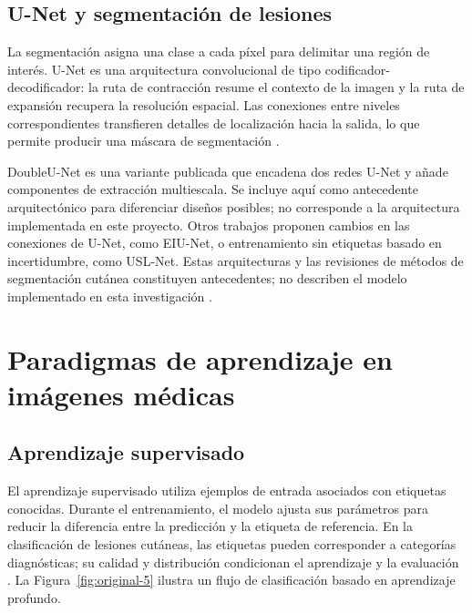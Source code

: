 \subsection{U-Net y segmentación de lesiones}

La segmentación asigna una clase a cada píxel para delimitar una región de interés. U-Net es una arquitectura convolucional de tipo codificador-decodificador: la ruta de contracción resume el contexto de la imagen y la ruta de expansión recupera la resolución espacial. Las conexiones entre niveles correspondientes transfieren detalles de localización hacia la salida, lo que permite producir una máscara de segmentación \parencite{ronneberger2015unet}.

DoubleU-Net es una variante publicada que encadena dos redes U-Net y añade componentes de extracción multiescala. Se incluye aquí como antecedente arquitectónico para diferenciar diseños posibles; no corresponde a la arquitectura implementada en este proyecto. Otros trabajos proponen cambios en las conexiones de U-Net, como EIU-Net, o entrenamiento sin etiquetas basado en incertidumbre, como USL-Net. Estas arquitecturas y las revisiones de métodos de segmentación cutánea constituyen antecedentes; no describen el modelo implementado en esta investigación \parencite{jha2020doubleunet,yu2023eiunet,li2024uslnet,sharma2025skinsegmentationreview}.


\section{Paradigmas de aprendizaje en imágenes médicas}

\subsection{Aprendizaje supervisado}

El aprendizaje supervisado utiliza ejemplos de entrada asociados con etiquetas conocidas. Durante el entrenamiento, el modelo ajusta sus parámetros para reducir la diferencia entre la predicción y la etiqueta de referencia. En la clasificación de lesiones cutáneas, las etiquetas pueden corresponder a categorías diagnósticas; su calidad y distribución condicionan el aprendizaje y la evaluación \parencite{goodfellow2016deeplearning,tschandl2018ham10000}. La Figura~\ref{fig:original-5} ilustra un flujo de clasificación basado en aprendizaje profundo.






